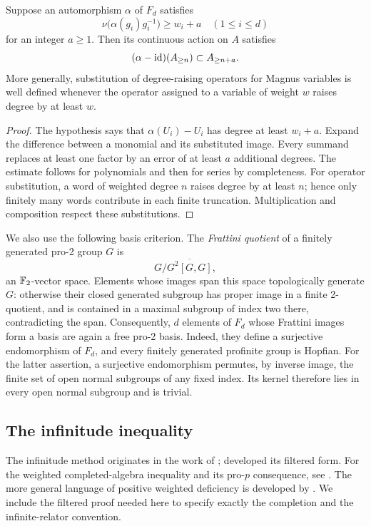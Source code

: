 \begin{lemma}[Substitution]\label{lem:substitution}
Suppose an automorphism $\alpha$ of $F_d$ satisfies
\[
 \nu\bigl(\alpha(g_i)g_i^{-1}\bigr)\ge w_i+a
 \quad(1\le i\le d)
\]
for an integer $a\ge1$. Then its continuous action on $A$ satisfies
\[
 (\alpha-\operatorname{id})(A_{\ge n})\subset A_{\ge n+a}.
\]
More generally, substitution of degree-raising operators for Magnus variables is well defined whenever the operator assigned to a variable of weight $w$ raises degree by at least $w$.
\end{lemma}

\begin{proof}
The hypothesis says that $\alpha(U_i)-U_i$ has degree at least $w_i+a$. Expand the difference between a monomial and its substituted image. Every summand replaces at least one factor by an error of at least $a$ additional degrees. The estimate follows for polynomials and then for series by completeness. For operator substitution, a word of weighted degree $n$ raises degree by at least $n$; hence only finitely many words contribute in each finite truncation. Multiplication and composition respect these substitutions.
\end{proof}

We also use the following basis criterion. The \emph{Frattini quotient} of a finitely generated pro-2 group $G$ is
\[
 G/\overline{G^2[G,G]},
\]
an $\mathbb F_2$-vector space. Elements whose images span this space topologically generate $G$: otherwise their closed generated subgroup has proper image in a finite 2-quotient, and is contained in a maximal subgroup of index two there, contradicting the span. Consequently, $d$ elements of $F_d$ whose Frattini images form a basis are again a free pro-2 basis. Indeed, they define a surjective endomorphism of $F_d$, and every finitely generated profinite group is Hopfian. For the latter assertion, a surjective endomorphism permutes, by inverse image, the finite set of open normal subgroups of any fixed index. Its kernel therefore lies in every open normal subgroup and is trivial.

\subsection{The infinitude inequality}

The infinitude method originates in the work of \citet{GolodShafarevich1964}; \citet{Vinberg1965} developed its filtered form. For the weighted completed-algebra inequality and its pro-$p$ consequence, see \citet[Theorem~2.1 and Corollary~2.2]{Ershov2011}. The more general language of positive weighted deficiency is developed by \citet[arXiv version, Corollary~4.4]{ErshovJaikinZapirain2013}. We include the filtered proof needed here to specify exactly the completion and the infinite-relator convention.

